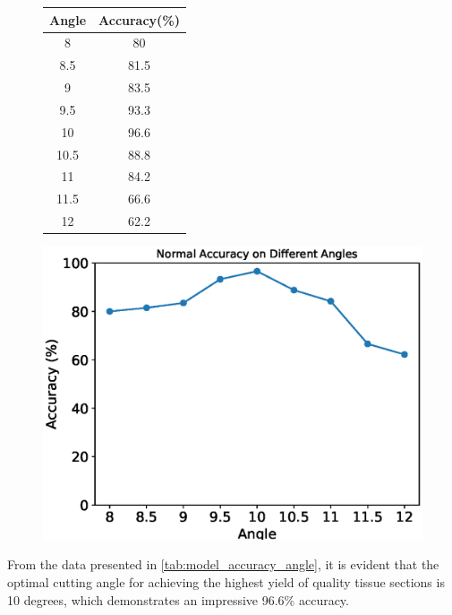 \begin{figure}[H]
    \centering
    \begin{minipage}{0.4\textwidth}
        \centering
        \begin{tabular}{cc}
            \toprule
            Angle & Accuracy(\%) \\
            \midrule
            8 & 80 \\
            8.5 & 81.5 \\
            9 & 83.5 \\
            9.5 & 93.3 \\
            10 & 96.6 \\
            10.5 & 88.8 \\
            11 & 84.2 \\
            11.5 & 66.6 \\
            12 & 62.2 \\
            \bottomrule
        \end{tabular}
        \label{tab:model_accuracy_angle}
    \end{minipage}
    \begin{minipage}{0.55\textwidth}
        \centering
        \includegraphics[width=\textwidth]{./fig/assistplot/angle_accuracy.eps}
        \label{fig:angle_accuracy_histogram}
    \end{minipage}
\end{figure}

From the data presented in \autoref{tab:model_accuracy_angle}, it is evident that the optimal cutting angle for achieving the highest yield of quality tissue sections is 10 degrees, which demonstrates an impressive 96.6\% accuracy.

